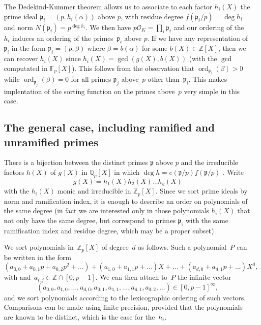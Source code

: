\documentclass{article}
\def\Z{{\mathbb Z}}
\def\Q{{\mathbb Q}}
\def\F{{\mathbb F}}
\def\OO{{\mathcal O}}
\def\p{{\mathfrak p}}
\DeclareMathOperator{\disc}{disc}
\DeclareMathOperator{\ord}{ord}
\begin{document}
The Dedekind-Kummer theorem allows us to associate to each factor
$h_i(X)$ the prime ideal $\p_i=(p,h_i(\alpha))$ above $p$, with
residue degree $f(\p_i/p)=\deg h_i$ and norm $N(\p_i)=p^{\deg h_i}$.
We then have $p\OO_K=\prod_i \p_i$ and our ordering of the $h_i$
induces an ordering of the primes~$\p_i$ above $p$.  If we have any
representation of $\p_i$ in the form $\p_i=(p,\beta)$ where
$\beta=b(\alpha)$ for some $b(X)\in\Z[X]$, then we can recover
$h_i(X)$ since $h_i(X)=\gcd(g(X),b(X))$ (with the $\gcd$ computated in
$\F_p[X]$).  This follows from the observation that
$\ord_{\p_i}(\beta)>0$ while $\ord_{\p_j}(\beta)=0$ for all primes
$\p_j$ above~$p$ other than~$\p_i$.  This makes implentation of the
sorting function on the primes above~$p$ very simple in this case.

\subsection{The general case, including ramified and unramified primes}

There is a bijection between the distinct primes $\p$ above $p$ and
the irreducible factors $h(X)$ of $g(X)$ in $\Q_p[X]$ in which $\deg h
= e(\p/p)f(\p/p)$ \cite[Theorem 3.8 (d)]{Janusz}.  Write
\[
  g(X) = h_1(X)h_2(X)\dots h_g(X)
\]
with the $h_i(X)$ monic and irreducible in $\Z_p[X]$. Since we sort prime ideals
by norm and ramification index, it is enough to describe an order on polynomials
of the same degree (in fact we are interested only in those polynomials $h_i(X)$
that not only have the same degree, but correspond to primes $\p_i$ with the same
ramification index and residue degree, which may be a proper subset).

We sort polynomials in~$\Z_p[X]$ of degree~$d$ as follows. Such a polynomial~$P$
can be written in the form
\[
  (a_{0,0}+a_{0,1}p+a_{0,2}p^2+\dots) + (a_{1,0}+a_{1,1}p+\dots)X
  + \dots + (a_{d,0}+a_{d,1}p+\dots)X^d,
\]
with and~$a_{i,j}\in\Z\cap[0,p-1]$. We can then attach to~$P$ the infinite
vector
\[
(a_{0,0},a_{1,0},\dots,a_{d,0},a_{0,1},a_{1,1},\dots,a_{d,1},a_{0,2},\dots)\in [0,p-1]^\infty,
\]
and we sort polynomials according to the lexicographic ordering of such vectors.
Comparisons can be made using finite precision, provided that the polynomials are known to be
distinct, which is the case for the~$h_i$.

\end{document}
